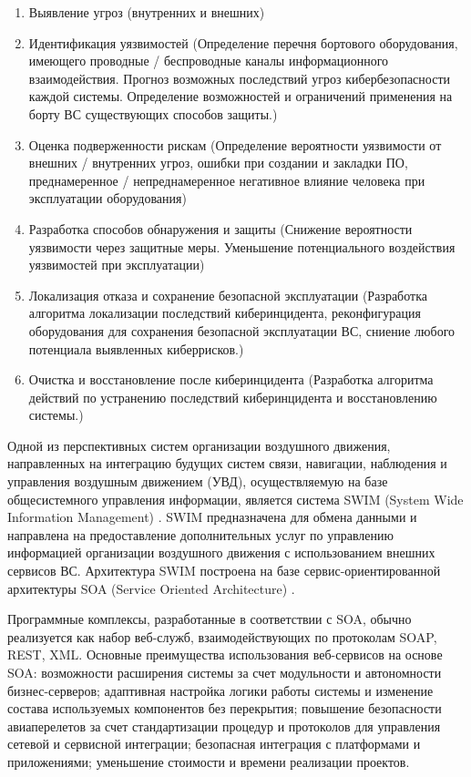 \begin{enumerate}
\item
Выявление угроз (внутренних и внешних)
\item
Идентификация уязвимостей (Определение перечня бортового оборудования, имеющего проводные / беспроводные каналы
информационного взаимодействия. Прогноз возможных последствий угроз кибербезопасности каждой системы.
Определение возможностей и ограничений применения на борту ВС существующих способов защиты.)
\item
Оценка подверженности рискам (Определение вероятности уязвимости от внешних / внутренних угроз,
ошибки при создании и закладки ПО, преднамеренное /
непреднамеренное негативное влияние
человека при эксплуатации оборудования)
\item
Разработка способов обнаружения и защиты (Снижение вероятности уязвимости через защитные меры. Уменьшение
потенциального воздействия уязвимостей при эксплуатации)
\item
Локализация отказа и сохранение безопасной эксплуатации (Разработка алгоритма локализации последствий
киберинцидента, реконфигурация оборудования для сохранения безопасной эксплуатации ВС, сниение любого потенциала
выявленных киберрисков.)
\item
Очистка и восстановление после киберинцидента (Разработка алгоритма действий по устранению последствий
киберинцидента и восстановлению системы.)
\end{enumerate}

Одной из перспективных систем организации воздушного движения, направленных
на интеграцию будущих систем связи, навигации, наблюдения и управления воздушным
движением (УВД), осуществляемую на базе общесистемного управления информации, является
система SWIM (System Wide Information Management) \cite{concept}. SWIM предназначена для обмена
данными и направлена на предоставление дополнительных услуг по управлению информацией
организации воздушного движения с использованием внешних сервисов ВС. Архитектура SWIM построена
на базе сервис-ориентированной архитектуры SOA (Service Oriented Architecture) \cite{soa}.

Программные комплексы, разработанные в соответствии с SOA, обычно реализуется как набор веб-служб,
взаимодействующих по протоколам SOAP, REST, XML. Основные преимущества использования веб-сервисов на основе SOA:
возможности расширения системы за счет модульности и автономности бизнес-серверов;
адаптивная настройка логики работы системы и изменение состава используемых компонентов без перекрытия;
повышение безопасности авиаперелетов за счет стандартизации процедур и протоколов для управления сетевой
и сервисной интеграции; безопасная интеграция с платформами и приложениями;
уменьшение стоимости и времени реализации проектов.

